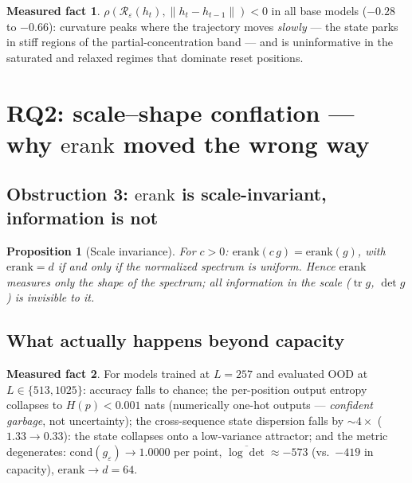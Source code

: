\documentclass[11pt,a4paper]{article}
\newtheorem{prop}{Proposition}
\theoremstyle{definition}
\newtheorem{meas}{Measured fact}
\theoremstyle{remark}
\begin{document}
\begin{meas}
$\rho(\mathcal{R}_\varepsilon(h_t), \|h_t - h_{t-1}\|) < 0$ in all base models ($-0.28$ to
$-0.66$): curvature peaks where the trajectory moves \emph{slowly} --- the state parks in stiff
regions of the partial-concentration band --- and is uninformative in the saturated and relaxed
regimes that dominate reset positions.
\end{meas}

\section{RQ2: scale--shape conflation --- why $\mathrm{erank}$ moved the wrong way}

\subsection{Obstruction 3: $\mathrm{erank}$ is scale-invariant, information is not}

\begin{prop}[Scale invariance]
For $c > 0$: $\mathrm{erank}(c\,g) = \mathrm{erank}(g)$, with $\mathrm{erank} = d$ if and only if
the normalized spectrum is uniform. Hence $\mathrm{erank}$ measures only the \emph{shape} of the
spectrum; all information in the \emph{scale} ($\operatorname{tr} g$, $\det g$) is invisible to it.
\end{prop}

\subsection{What actually happens beyond capacity}

\begin{meas}
For models trained at $L = 257$ and evaluated OOD at $L \in \{513, 1025\}$: accuracy falls to
chance; the per-position output entropy collapses to $H(p) < 0.001$ nats (numerically one-hot
outputs --- \emph{confident garbage}, not uncertainty); the cross-sequence state dispersion falls
by ${\sim}4\times$ ($1.33 \to 0.33$): the state collapses onto a low-variance attractor; and the
metric degenerates: $\mathrm{cond}(g_\varepsilon) \to 1.0000$ per point,
$\overline{\log\det} \approx -573$ (vs.\ $-419$ in capacity), $\mathrm{erank} \to d = 64$.
\end{meas}
\end{document}
